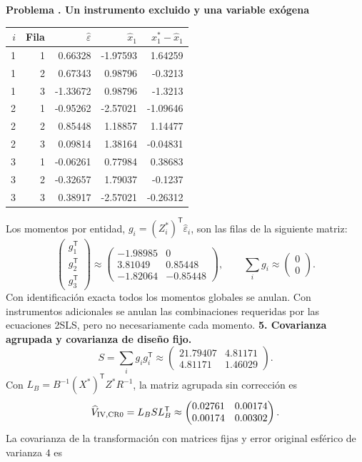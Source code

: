 \documentclass[11pt,a4paper]{article}
\newcommand{\T}{^{\mathsf T}}
\theoremstyle{definition}
\newcounter{problema}
\newenvironment{resuelto}[1]{\refstepcounter{problema}\par\medskip\Needspace{6\baselineskip}\textbf{Problema \theproblema. #1}\par}{\par\medskip}
\newcommand{\eps}{\varepsilon}
\begin{document}
\begin{resuelto}{Un instrumento excluido y una variable exógena}
\begin{center}\small
\begin{tabular}{rrrrr}
\toprule
$i$&Fila&$\widehat\eps$&$\widehat x_1$&$x_1^*-\widehat x_1$\\
\midrule
1&1&0.66328&-1.97593&1.64259\\
1&2&0.67343&0.98796&-0.3213\\
1&3&-1.33672&0.98796&-1.3213\\
2&1&-0.95262&-2.57021&-1.09646\\
2&2&0.85448&1.18857&1.14477\\
2&3&0.09814&1.38164&-0.04831\\
3&1&-0.06261&0.77984&0.38683\\
3&2&-0.32657&1.79037&-0.1237\\
3&3&0.38917&-2.57021&-0.26312\\
\bottomrule
\end{tabular}
\end{center}
Los momentos por entidad, $g_i=(Z_i^*)\T\widehat\eps_i$, son las filas de la siguiente matriz:
\[
\begin{pmatrix}g_1\T\\g_2\T\\g_3\T\end{pmatrix}\approx\begin{pmatrix}
-1.98985&0\\3.81049&0.85448\\-1.82064&-0.85448
\end{pmatrix},\qquad \sum_i g_i\approx\begin{pmatrix}
0\\0
\end{pmatrix}.
\]
Con identificación exacta todos los momentos globales se anulan. Con instrumentos adicionales se anulan las combinaciones requeridas por las ecuaciones 2SLS, pero no necesariamente cada momento.
\textbf{5. Covarianza agrupada y covarianza de diseño fijo.}
\[
S=\sum_i g_ig_i\T\approx\begin{pmatrix}
21.79407&4.81171\\4.81171&1.46029
\end{pmatrix}.
\]
Con $L_B=B^{-1}(X^*)\T Z^*R^{-1}$, la matriz agrupada sin corrección es
\[
\widehat V_{\rm IV,CR0}=L_BSL_B\T\approx\begin{pmatrix}
0.02761&0.00174\\0.00174&0.00302
\end{pmatrix}.
\]
La covarianza de la transformación con matrices fijas y error original esférico de varianza $4$ es

\end{resuelto}
\end{document}
